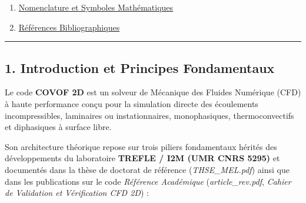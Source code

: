 \documentclass[
  french,
]{article}
\providecommand{\tightlist}{%
  \setlength{\itemsep}{0pt}\setlength{\parskip}{0pt}}
\begin{document}
\begin{enumerate}
  \begin{itemize}
  \tightlist
  \item
    8.1. Restriction Convective CFL
  \item
    8.2. Restriction Visqueuse
  \item
    8.3. Restriction Capillaire de Brackbill
  \item
    8.4. Algorithme d'Adaptation Automatique du Pas de Temps
  \end{itemize}
\item
  \hyperref[9-nomenclature-et-symboles-mathuxe9matiques]{Nomenclature et
  Symboles Mathématiques}
\item
  \hyperref[10-ruxe9fuxe9rences-bibliographiques]{Références
  Bibliographiques}
\end{enumerate}

\begin{center}\rule{0.5\linewidth}{0.5pt}\end{center}

\subsection{1. Introduction et Principes
Fondamentaux}\label{introduction-et-principes-fondamentaux}

Le code \textbf{COVOF 2D} est un solveur de Mécanique des Fluides
Numérique (CFD) à haute performance conçu pour la simulation directe des
écoulements incompressibles, laminaires ou instationnaires,
monophasiques, thermoconvectifs et diphasiques à surface libre.

Son architecture théorique repose sur trois piliers fondamentaux hérités
des développements du laboratoire \textbf{TREFLE / I2M (UMR CNRS 5295)}
et documentés dans la thèse de doctorat de référence
(\emph{THSE\_MEL.pdf}) ainsi que dans les publications sur le code
\emph{Référence Académique} (\emph{article\_rev.pdf}, \emph{Cahier de
Validation et Vérification CFD 2D}) :
\end{document}

